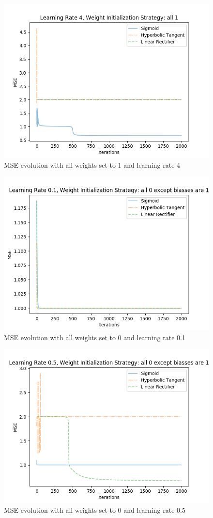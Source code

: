 \documentclass{article}
\begin{document}
\begin{figure}[H]
\centering
\includegraphics[width=0.9\linewidth]{img/mse_all1_4.png}
\caption{MSE evolution with all weights set to 1 and learning rate 4}
\label{fig:mse14}
\end{figure}
\begin{figure}[H]
\centering
\includegraphics[width=0.9\linewidth]{img/mse_all0exceptbiassesare1_01.png}
\caption{MSE evolution with all weights set to 0 and learning rate 0.1}
\label{fig:mse201}
\end{figure}
\begin{figure}[H]
\centering
\includegraphics[width=0.9\linewidth]{img/mse_all0exceptbiassesare1_05.png}
\caption{MSE evolution with all weights set to 0 and learning rate 0.5}
\label{fig:mse205}
\end{figure}
\end{document}

